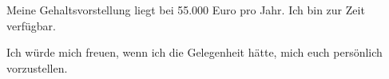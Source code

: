 \documentclass[11pt,a4paper,skipsamekey]{moderncv}
\begin{document}
Meine Gehaltsvorstellung liegt bei 55.000 Euro pro Jahr. Ich bin zur Zeit verfügbar.

Ich würde mich freuen, wenn ich die Gelegenheit hätte, mich euch persönlich vorzustellen.
   
	\vspace{0.25cm}
	\makeletterclosing
	
	
	
\end{document}
